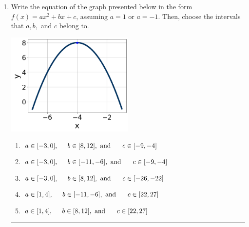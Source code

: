 \documentclass[14pt]{extbook}
\newcommand{\litem}[1]{\item#1\hspace*{-1cm}\rule{\textwidth}{0.4pt}}
\begin{document}
\begin{enumerate}
{\begin{enumerate}[label=\Alph*.]
\end{enumerate} }
\litem{
Write the equation of the graph presented below in the form $f(x)=ax^2+bx+c$, assuming  $a=1$ or $a=-1$. Then, choose the intervals that $a, b,$ and $c$ belong to.
\begin{center}
    \includegraphics[width=0.5\textwidth]{../Figures/quadraticGraphToEquationCopyB.png}
\end{center}
\begin{enumerate}[label=\Alph*.]
\item \( a \in [-3, 0], \hspace*{5mm} b \in [8, 12], \text{ and } \hspace*{5mm} c \in [-9, -4] \)
\item \( a \in [-3, 0], \hspace*{5mm} b \in [-11, -6], \text{ and } \hspace*{5mm} c \in [-9, -4] \)
\item \( a \in [-3, 0], \hspace*{5mm} b \in [8, 12], \text{ and } \hspace*{5mm} c \in [-26, -22] \)
\item \( a \in [1, 4], \hspace*{5mm} b \in [-11, -6], \text{ and } \hspace*{5mm} c \in [22, 27] \)
\item \( a \in [1, 4], \hspace*{5mm} b \in [8, 12], \text{ and } \hspace*{5mm} c \in [22, 27] \)


\end{enumerate}}
\end{enumerate}
\end{document}
